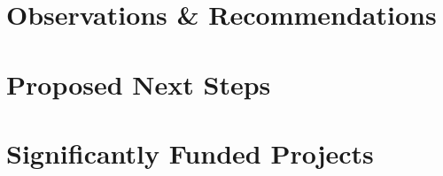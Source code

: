 \documentclass[10pt, letterpaper, final, twoside, onecolumn]{memoir}%
\begin{document}
\begin{landscape}
%
%
%
%
%
%
%
%
%
%
%
%


\end{landscape}
\pagestyle{headings}


\chapter{Observations \& Recommendations}


\chapter{Proposed Next Steps}

\appendix
\chapter{Significantly Funded Projects}
\label{ch:sigfund}
\end{document}
